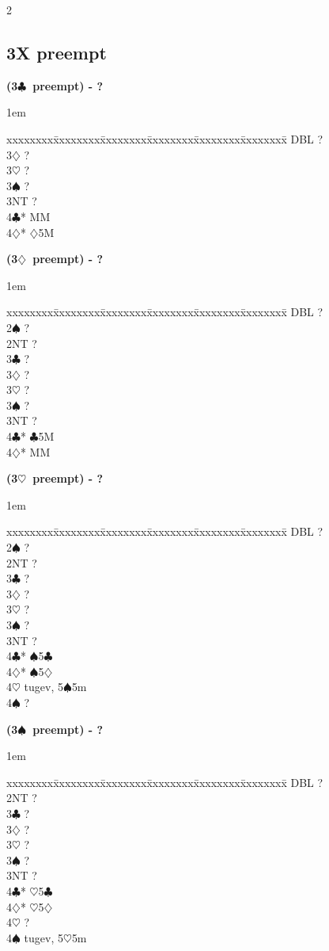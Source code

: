 \documentclass[10pt]{article}
\renewcommand{\c}{$\clubsuit$}
\renewcommand{\d}{$\diamondsuit$}
\newcommand{\h}{$\heartsuit$}
\newcommand{\s}{$\spadesuit$}
\newcommand{\x}{DBL}
\newenvironment{bidtable}[1][]
{\textbf{#1}
  \begin{adjustwidth}{1em}{}
    \addvspace{2pt}
    \begin{tabbing}
      xxxxxxxx\=xxxxxxxx\=xxxxxxxx\=xxxxxxxx\=xxxxxxxx\=xxxxxxxx\=\kill}
{\end{tabbing}\end{adjustwidth}\bigskip}%
\begin{document}
\begin{multicols*}{2}
\subsection{3X preempt}

\begin{bidtable}[(3\c\ preempt) - ?]
\x   \> ?     \\
3\d  \> ?     \\
3\h  \> ?     \\
3\s  \> ?     \\
3NT  \> ?     \\
4\c* {} MM \\
4\d* {}\d 5M
\end{bidtable}

\begin{bidtable}[(3\d\ preempt) - ?]
\x   \> ?      \\
2\s  \> ?      \\
2NT  \> ?      \\
3\c  \> ?      \\
3\d  \> ?      \\
3\h  \> ?      \\
3\s  \> ?      \\
3NT  \> ?      \\
4\c* {}\c 5M \\
4\d* {} MM
\end{bidtable}

\begin{bidtable}[(3\h\ preempt) - ?]
\x   \> ?       \\
2\s  \> ?       \\
2NT  \> ?       \\
3\c  \> ?       \\
3\d  \> ?       \\
3\h  \> ?       \\
3\s  \> ?       \\
3NT  \> ?       \\
4\c* {}\s 5\c \\
4\d* {}\s 5\d \\
4\h \> tugev, 5\s 5m \\
4\s \> ? \\
\end{bidtable}

\begin{bidtable}[(3\s\ preempt) - ?]
\x   \> ?       \\
2NT  \> ?       \\
3\c  \> ?       \\
3\d  \> ?       \\
3\h  \> ?       \\
3\s  \> ?       \\
3NT  \> ?       \\
4\c* {}\h 5\c \\
4\d* {}\h 5\d \\
4\h  \> ?       \\
4\s  \> tugev, 5\h 5m
\end{bidtable}


\end{multicols*}
\end{document}
